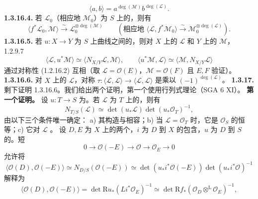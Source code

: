 \[\langle a,b\rangle=a^{\deg(\mathscr M)}b^{\deg(\mathscr L)}.\]
\textbf{1.3.16.4.} 若 $\mathscr L_0$（相应地 $\mathscr M_0$）为 $S$ 上的，则有
\[\langle f^*\mathscr L_0,\mathscr M\rangle\xrightarrow\sim\mathscr L_0^{\otimes\deg(\mathscr M)}\qquad
(\text{相应地 }\langle\mathscr L,f^*\mathscr M_0\rangle\xrightarrow\sim\mathscr M_0^{\otimes\deg(\mathscr L)}).\]
\textbf{1.3.16.5.} 若 $u:X\to Y$ 为 $S$ 上曲线之间的，则对 $X$ 上的 $\mathscr L$ 和 $Y$ 上的 $\mathscr M$， 1.2.9.7
\[\langle\mathscr L,u^*\mathscr M\rangle\simeq\langle N_{X/Y}\mathscr L,\mathscr M\rangle,\qquad
\langle u^*\mathscr M,\mathscr L\rangle\simeq\langle\mathscr M,N_{X/Y}\mathscr L\rangle\]
通过对称性 (1.2.16.2) 互相（取 $\mathscr L=\mathscr O(E)$，$\mathscr M=\mathscr O(F)$ 且 $E,F$ 验证）。
\textbf{1.3.16.6.} 对 $X$ 上的 $\mathscr L$，对称 $\tau:\langle\mathscr L,\mathscr L\rangle\to\langle\mathscr L,\mathscr L\rangle$ 是乘以 $(-1)^{\deg(\mathscr L)}$。
\textbf{1.3.17.} 剩下证明 1.3.16.6。我们给出两个证明，第一个使用行列式理论（SGA 6 XI）。
\textbf{第一个证明。} 设 $u:T\to S$ 为。若 $\mathscr L$ 为 $T$ 上的，则有
\begin{equation}N_{T/S}(\mathscr L)\simeq\det(u_*\mathscr L)\det(u_*\mathscr O_T)^{-1},\tag{1.3.17.1}\end{equation}
由以下三个条件唯一确定：
a) 其构造与相容；b) 当 $\mathscr L=\mathscr O_T$ 时，它是 $\mathscr O_S$ 的恒等；c) 它对 $\mathscr L$ 。
设 $D,E$ 为 $X$ 上的两个，$i$ 为 $D$ 到 $X$ 的包含，$u$ 为 $D$ 到 $S$ 的。短
\[0\longrightarrow\mathscr O(-E)\longrightarrow\mathscr O\longrightarrow\mathscr O_E\longrightarrow0\]
允许将
\[\langle\mathscr O(D),\mathscr O(-E)\rangle\simeq N_{D/S}(\mathscr O(-E))\simeq\det(u_*i^*\mathscr O(-E))\det(u_*i^*\mathscr O)^{-1}\]
解释为
\[\langle\mathscr O(D),\mathscr O(-E)\rangle=\det\mathrm Ru_*(Li^*\mathscr O_E)^{-1}\simeq\det\mathrm Rf_*(\mathscr O_D\mathbin{\mathop\otimes^{\mathrm L}}\mathscr O_E)^{-1},\]
